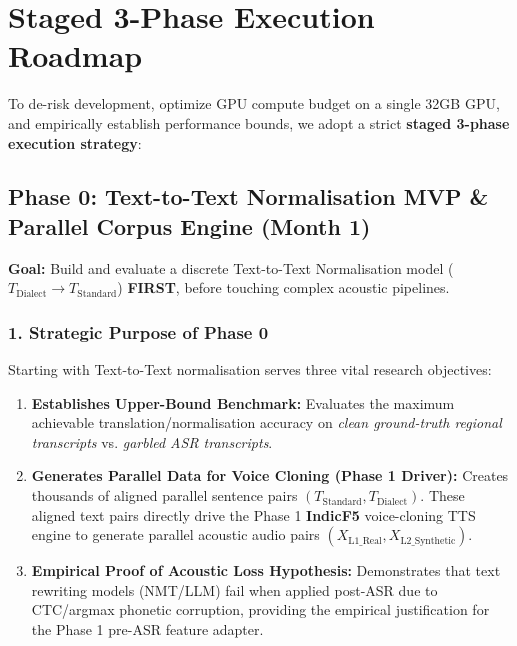 \documentclass[11pt]{article}
\begin{document}
\section{Staged 3-Phase Execution Roadmap}

To de-risk development, optimize GPU compute budget on a single 32GB GPU, and empirically establish performance bounds, we adopt a strict \textbf{staged 3-phase execution strategy}:

\subsection{Phase 0: Text-to-Text Normalisation MVP \& Parallel Corpus Engine (Month 1)}

\textbf{Goal:} Build and evaluate a discrete Text-to-Text Normalisation model ($T_{\text{Dialect}} \to T_{\text{Standard}}$) \textbf{FIRST}, before touching complex acoustic pipelines.

\subsubsection{1. Strategic Purpose of Phase 0}
Starting with Text-to-Text normalisation serves three vital research objectives:
\begin{enumerate}[leftmargin=*]
  \item \textbf{Establishes Upper-Bound Benchmark:} Evaluates the maximum achievable translation/normalisation accuracy on \textit{clean ground-truth regional transcripts} vs. \textit{garbled ASR transcripts}.
  \item \textbf{Generates Parallel Data for Voice Cloning (Phase 1 Driver):} Creates thousands of aligned parallel sentence pairs $(T_{\text{Standard}}, T_{\text{Dialect}})$. These aligned text pairs directly drive the Phase 1 \textbf{IndicF5} voice-cloning TTS engine to generate parallel acoustic audio pairs $(X_{\text{L1\_Real}}, X_{\text{L2\_Synthetic}})$.
  \item \textbf{Empirical Proof of Acoustic Loss Hypothesis:} Demonstrates that text rewriting models (NMT/LLM) fail when applied post-ASR due to CTC/argmax phonetic corruption, providing the empirical justification for the Phase 1 pre-ASR feature adapter.
\end{enumerate}
\end{document}
